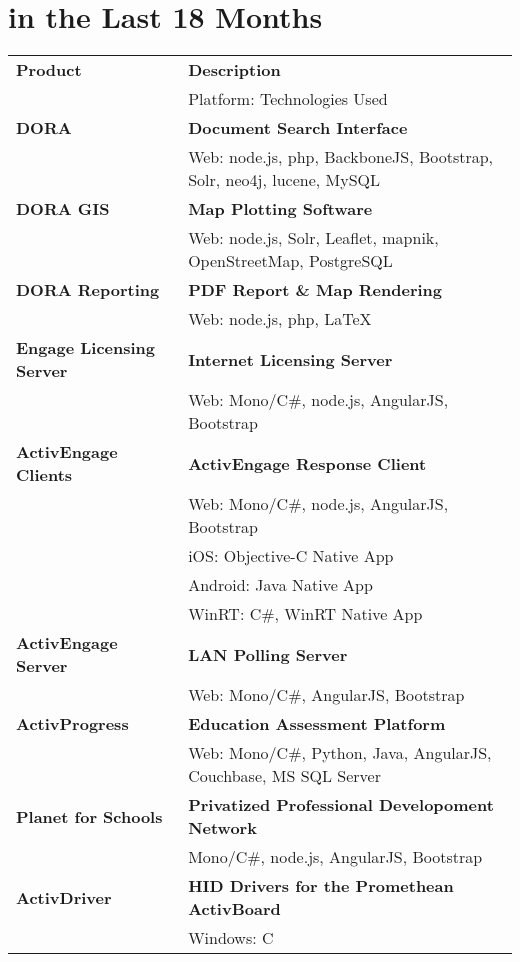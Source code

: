 \section{ in the Last 18 Months}
\noindent \begin{tabular}{ p{4cm} p{10.5cm} }
\textbf{Product} & \textbf{Description}\\
 & Platform: Technologies Used \\
\midrule
\textbf{DORA} & \textbf{Document Search Interface}\\
 & Web: node.js, php, BackboneJS, Bootstrap, Solr, neo4j, lucene, MySQL\\
\midrule
\textbf{DORA GIS} & \textbf{Map Plotting Software}\\
 & Web: node.js, Solr, Leaflet, mapnik, OpenStreetMap, PostgreSQL\\
\midrule
\textbf{DORA Reporting} & \textbf{PDF Report \& Map Rendering}\\
 & Web: node.js, php, LaTeX\\
\midrule
\textbf{Engage Licensing Server} & \textbf{Internet Licensing Server} \\
 & Web: Mono/C\#, node.js, AngularJS, Bootstrap\\
\midrule
\textbf{ActivEngage Clients} & \textbf{ActivEngage Response Client}\\
 & Web: Mono/C\#, node.js, AngularJS, Bootstrap\\
 & iOS: Objective-C Native App\\
 & Android: Java Native App\\
 & WinRT: C\#, WinRT Native App\\
\midrule
\textbf{ActivEngage Server} & \textbf{LAN Polling Server}\\
 & Web: Mono/C\#, AngularJS, Bootstrap\\
\midrule
\textbf{ActivProgress} & \textbf{Education Assessment Platform}\\
 & Web: Mono/C\#, Python, Java, AngularJS, Couchbase, MS SQL Server\\
\midrule
\textbf{Planet for Schools} & \textbf{Privatized Professional Developoment Network}\\
 & Mono/C\#, node.js, AngularJS, Bootstrap\\
\midrule
\textbf{ActivDriver} & \textbf{HID Drivers for the Promethean ActivBoard}\\
 & Windows: C\\

\end{tabular}
